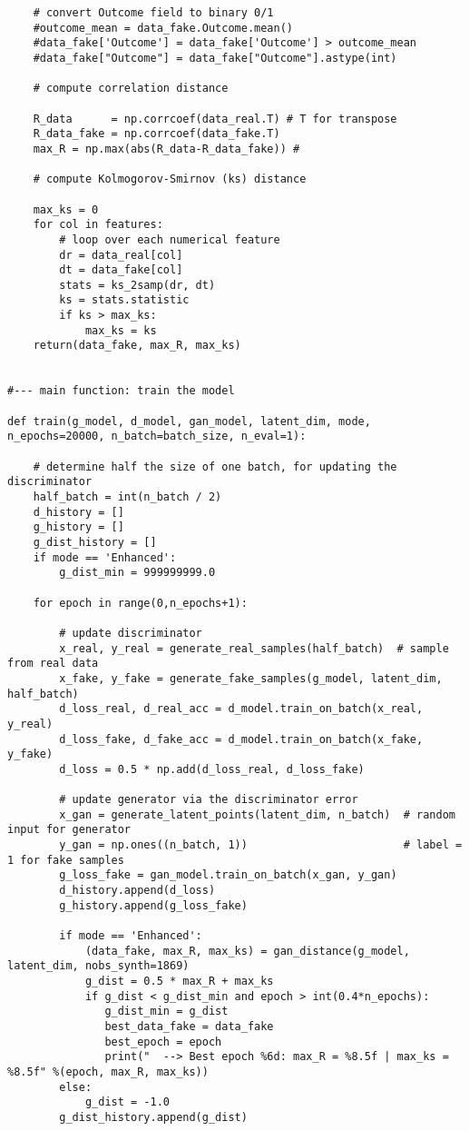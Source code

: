 \documentclass[oneside,10pt]{book}
\begin{document}
\begin{lstlisting}
    # convert Outcome field to binary 0/1
    #outcome_mean = data_fake.Outcome.mean()
    #data_fake['Outcome'] = data_fake['Outcome'] > outcome_mean
    #data_fake["Outcome"] = data_fake["Outcome"].astype(int)

    # compute correlation distance
    
    R_data      = np.corrcoef(data_real.T) # T for transpose
    R_data_fake = np.corrcoef(data_fake.T)
    max_R = np.max(abs(R_data-R_data_fake)) # 

    # compute Kolmogorov-Smirnov (ks) distance

    max_ks = 0
    for col in features:
        # loop over each numerical feature
        dr = data_real[col]
        dt = data_fake[col]
        stats = ks_2samp(dr, dt)
        ks = stats.statistic
        if ks > max_ks:
            max_ks = ks 
    return(data_fake, max_R, max_ks) 


#--- main function: train the model

def train(g_model, d_model, gan_model, latent_dim, mode, n_epochs=20000, n_batch=batch_size, n_eval=1):   
    
    # determine half the size of one batch, for updating the  discriminator
    half_batch = int(n_batch / 2)
    d_history = [] 
    g_history = [] 
    g_dist_history = []
    if mode == 'Enhanced':
        g_dist_min = 999999999.0  

    for epoch in range(0,n_epochs+1): 
                 
        # update discriminator
        x_real, y_real = generate_real_samples(half_batch)  # sample from real data
        x_fake, y_fake = generate_fake_samples(g_model, latent_dim, half_batch)
        d_loss_real, d_real_acc = d_model.train_on_batch(x_real, y_real) 
        d_loss_fake, d_fake_acc = d_model.train_on_batch(x_fake, y_fake)
        d_loss = 0.5 * np.add(d_loss_real, d_loss_fake)

        # update generator via the discriminator error
        x_gan = generate_latent_points(latent_dim, n_batch)  # random input for generator
        y_gan = np.ones((n_batch, 1))                        # label = 1 for fake samples
        g_loss_fake = gan_model.train_on_batch(x_gan, y_gan) 
        d_history.append(d_loss)
        g_history.append(g_loss_fake)

        if mode == 'Enhanced': 
            (data_fake, max_R, max_ks) = gan_distance(g_model, latent_dim, nobs_synth=1869) 
            g_dist = 0.5 * max_R + max_ks 
            if g_dist < g_dist_min and epoch > int(0.4*n_epochs): 
               g_dist_min = g_dist
               best_data_fake = data_fake
               best_epoch = epoch
               print("  --> Best epoch %6d: max_R = %8.5f | max_ks = %8.5f" %(epoch, max_R, max_ks))
        else: 
            g_dist = -1.0
        g_dist_history.append(g_dist)
                

\end{lstlisting}
\end{document}

